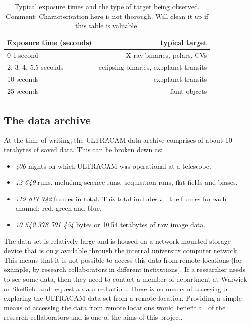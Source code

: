 \begin{table}
  \begin{center}
	\begin{tabular}{|l|r|}
		\hline
		Exposure time (seconds) & typical target \\
		\hline
		0-1 second & X-ray binaries, polars, CVs \\
		2, 3, 4, 5.5 seconds & eclipsing binaries, exoplanet transits \\
		10 seconds & exoplanet transits \\
		25 seconds & faint objects \\
		\hline
	\end{tabular}
  \end{center}
\label{tab:breakdown}
\caption{Typical exposure times and the type of target being observed. Comment: Characterisation here is not thorough. Will clean it up if this table is valuable.
}
\end{table}

\subsection{The data archive}
At the time of writing, the ULTRACAM data archive comprises of about 10 terabytes of saved data. This can be broken down as:
\begin{itemize}
	\item \emph{406} nights on which ULTRACAM was operational at a telescope.
	\item \emph{12 649} runs, including science runs, acquisition runs, flat fields and biases. 
	\item \emph{119 817 742} frames in total. This total includes all the frames for each channel: red, green and blue.
	\item \emph{10 542 378 791 454} bytes or 10.54 terabytes of raw image data.
\end{itemize} 

The data set is relatively large and is housed on a network-mounted storage device that is only available through the internal university computer network. This means that it is not possible to access this data from remote locations (for example, by research collaborators in different institutions). If a researcher needs to see some data, then they need to contact a member of department at Warwick or Sheffield and request a data reduction. There is no means of accessing or exploring the ULTRACAM data set from a remote location. Providing a simple means of accessing the data from remote locations would benefit all of the research collaborators and is one of the aims of this project.


